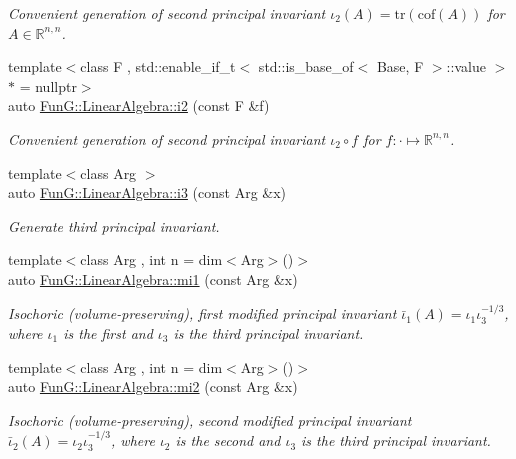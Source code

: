 \begin{DoxyCompactItemize}
\begin{DoxyCompactList}\small\item\em Convenient generation of second principal invariant $ \iota_2(A)=\mathrm{tr}(\mathrm{cof}(A)) $ for $A\in\mathbb{R}^{n,n}$. \end{DoxyCompactList}\item 
{\footnotesize template$<$class F , std\+::enable\+\_\+if\+\_\+t$<$ std\+::is\+\_\+base\+\_\+of$<$ Base, F $>$\+::value $>$ $\ast$  = nullptr$>$ }\\auto \hyperlink{group__InvariantGroup_gad3987f97353c8696e602ed1915b3cf47}{Fun\+G\+::\+Linear\+Algebra\+::i2} (const F \&f)
\begin{DoxyCompactList}\small\item\em Convenient generation of second principal invariant $ \iota_2\circ f $ for $f:\cdot\mapsto\mathbb{R}^{n,n}$. \end{DoxyCompactList}\item 
{\footnotesize template$<$class Arg $>$ }\\auto \hyperlink{group__InvariantGroup_gae1ad80b4b2f34a10564114fad28bc313}{Fun\+G\+::\+Linear\+Algebra\+::i3} (const Arg \&x)
\begin{DoxyCompactList}\small\item\em Generate third principal invariant. \end{DoxyCompactList}\item 
{\footnotesize template$<$class Arg , int n = dim$<$\+Arg$>$()$>$ }\\auto \hyperlink{group__InvariantGroup_ga7eed5e2661171d81e192ac1db791244c}{Fun\+G\+::\+Linear\+Algebra\+::mi1} (const Arg \&x)
\begin{DoxyCompactList}\small\item\em Isochoric (volume-\/preserving), first modified principal invariant $ \bar\iota_1(A)=\iota_1\iota_3^{-1/3} $, where $\iota_1$ is the first and $\iota_3$ is the third principal invariant. \end{DoxyCompactList}\item 
{\footnotesize template$<$class Arg , int n = dim$<$\+Arg$>$()$>$ }\\auto \hyperlink{group__InvariantGroup_ga9d219c5c48cce1d3af60345916963524}{Fun\+G\+::\+Linear\+Algebra\+::mi2} (const Arg \&x)
\begin{DoxyCompactList}\small\item\em Isochoric (volume-\/preserving), second modified principal invariant $ \bar\iota_2(A)=\iota_2\iota_3^{-1/3} $, where $\iota_2$ is the second and $\iota_3$ is the third principal invariant. \end{DoxyCompactList}\end{DoxyCompactItemize}


